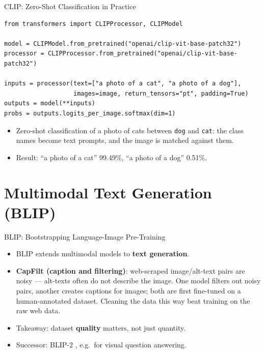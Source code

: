 \begin{frame}[fragile]{CLIP: Zero-Shot Classification in Practice}
\scriptsize
\begin{verbatim}
from transformers import CLIPProcessor, CLIPModel

model = CLIPModel.from_pretrained("openai/clip-vit-base-patch32")
processor = CLIPProcessor.from_pretrained("openai/clip-vit-base-patch32")

inputs = processor(text=["a photo of a cat", "a photo of a dog"],
                   images=image, return_tensors="pt", padding=True)
outputs = model(**inputs)
probs = outputs.logits_per_image.softmax(dim=1)
\end{verbatim}
\normalsize
\begin{itemize}
  \item Zero-shot classification of a photo of cats between \texttt{dog} and \texttt{cat}: the class names become text prompts, and the image is matched against them.
  \item Result: \enquote{a photo of a cat} 99.49\%, \enquote{a photo of a dog} 0.51\%.
\end{itemize}
\end{frame}

\section{Multimodal Text Generation (BLIP)}

\begin{frame}{BLIP: Bootstrapping Language-Image Pre-Training}
\begin{itemize}
  \item BLIP  extends multimodal models to \textbf{text generation}.
  \item \textbf{CapFilt (caption and filtering)}: web-scraped image/alt-text pairs are noisy --- alt-texts often do not describe the image. One model filters out noisy pairs, another creates captions for images; both are first fine-tuned on a human-annotated dataset. Cleaning the data this way beat training on the raw web data.
  \item Takeaway: dataset \textbf{quality} matters, not just quantity.
  \item Successor: BLIP-2 , e.g.\ for visual question answering.
\end{itemize}
\end{frame}

